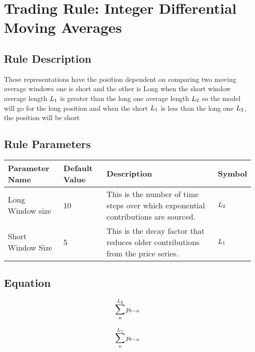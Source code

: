 \documentclass{article}
\begin{document}
\logo
\tblofcontents
\section*{Trading Rule: Integer Differential Moving Averages}

\subsection{Rule Description}


These representations have the position dependent on comparing two moving average windows one is short and the other is Long when the short window average length $L_{1}$ is greater than the long one average length $L_{2}$ so the model will go for the long position and when the short $L_{1}$ is less than the long one $L_{2}$, the position will be short \\

\subsection{Rule Parameters}
\begin{center}
\begin{tabular}{|m{9em}| m{3em}| m{15em}| m{3em}|}
\hline
Parameter Name & Default Value &	Description & Symbol \\
\hline
Long Window size & 	10	 & This is the number of time steps over which exponential contributions are sourced. & $L_{2}$ \\
\hline
Short Window Size & 	5	 & This is the decay factor that reduces older contributions from the price series. & $L_{1}$ \\
\hline

\end{tabular}
\end{center}

\subsection{Equation}


\begin{equation}
\sum_{n}^{L_{2}} p_{t - n} \\
\label{eq1}
\end{equation}

\begin{equation}
\sum_{n}^{L_{1}} p_{t - n} \\
\label{eq2}
\end{equation}
\end{document}
